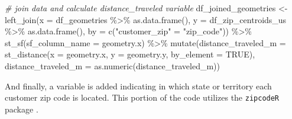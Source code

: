\documentclass[
]{book}
\newenvironment{Shaded}{\begin{snugshade}}{\end{snugshade}}
\newcommand{\AttributeTok}[1]{\textcolor[rgb]{0.77,0.63,0.00}{#1}}
\newcommand{\CommentTok}[1]{\textcolor[rgb]{0.56,0.35,0.01}{\textit{#1}}}
\newcommand{\ConstantTok}[1]{\textcolor[rgb]{0.00,0.00,0.00}{#1}}
\newcommand{\FunctionTok}[1]{\textcolor[rgb]{0.00,0.00,0.00}{#1}}
\newcommand{\NormalTok}[1]{#1}
\newcommand{\OtherTok}[1]{\textcolor[rgb]{0.56,0.35,0.01}{#1}}
\newcommand{\SpecialCharTok}[1]{\textcolor[rgb]{0.00,0.00,0.00}{#1}}
\newcommand{\StringTok}[1]{\textcolor[rgb]{0.31,0.60,0.02}{#1}}
\begin{document}
\begin{Shaded}
\begin{Highlighting}[]
\CommentTok{\# join data and calculate \textasciigrave{}distance\_traveled\textasciigrave{} variable}
\NormalTok{df\_joined\_geometries }\OtherTok{\textless{}{-}} 
  \FunctionTok{left\_join}\NormalTok{(}\AttributeTok{x =}\NormalTok{ df\_geometries }\SpecialCharTok{\%\textgreater{}\%} \FunctionTok{as.data.frame}\NormalTok{(),}
            \AttributeTok{y =}\NormalTok{ df\_zip\_centroids\_us }\SpecialCharTok{\%\textgreater{}\%} \FunctionTok{as.data.frame}\NormalTok{(), }
            \AttributeTok{by =} \FunctionTok{c}\NormalTok{(}\StringTok{"customer\_zip"} \OtherTok{=} \StringTok{"zip\_code"}\NormalTok{)) }\SpecialCharTok{\%\textgreater{}\%}
  \FunctionTok{st\_sf}\NormalTok{(}\AttributeTok{sf\_column\_name =} \StringTok{\textquotesingle{}geometry.x\textquotesingle{}}\NormalTok{) }\SpecialCharTok{\%\textgreater{}\%} 
  \FunctionTok{mutate}\NormalTok{(}\AttributeTok{distance\_traveled\_m =} \FunctionTok{st\_distance}\NormalTok{(}\AttributeTok{x =}\NormalTok{ geometry.x, }
                                           \AttributeTok{y =}\NormalTok{ geometry.y,}
                                           \AttributeTok{by\_element =} \ConstantTok{TRUE}\NormalTok{),}
         \AttributeTok{distance\_traveled\_m =} \FunctionTok{as.numeric}\NormalTok{(distance\_traveled\_m)) }
\end{Highlighting}
\end{Shaded}

And finally, a variable is added indicating in which state or territory each customer zip code is located. This portion of the code utilizes the \texttt{zipcodeR} package \citep{R-zipcodeR}.
\end{document}

